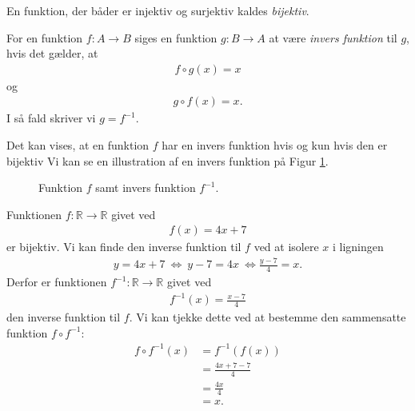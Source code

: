 \begin{defn}
	En funktion, der båder er injektiv og surjektiv kaldes \textit{bijektiv}.
\end{defn}

\begin{defn}
	For en funktion $f:A\to B$ siges en funktion $g:B\to A$ at være \textit{invers funktion} til $g$, hvis det gælder, 
	at 
	\begin{align*}
		f\circ g (x) = x
	\end{align*}
	og
	\begin{align*}
		g \circ f(x) = x.
	\end{align*}
	I så fald skriver vi $g = f^{-1}$.
\end{defn}
Det kan vises, at en funktion $f$ har en invers funktion hvis og kun hvis den er bijektiv
Vi kan se en illustration af en invers funktion på Figur \ref{fig:inv}. 
\begin{figure}[H]
	\centering
	\caption{Funktion $f$ samt invers funktion $f^{-1}$.}
	\label{fig:inv}
\end{figure}
\begin{exa}
Funktionen $f: \mathbb{R} \to \mathbb{R}$ givet ved
\begin{align*}
	f(x) = 4x+7
\end{align*}
er bijektiv. Vi kan finde den inverse funktion til $f$ ved at isolere $x$ i ligningen
\begin{align*}
	y = 4x+7 \ \Leftrightarrow \ y-7 = 4x \ \Leftrightarrow \frac{y-7}{4} = x.
\end{align*}
Derfor er funktionen $f^{-1}:\mathbb{R} \to \mathbb{R}$ givet ved
\begin{align*}
	f^{-1}(x) = \frac{x-7}{4}
\end{align*}
den inverse funktion til $f$. Vi kan tjekke dette ved at bestemme den sammensatte funktion $f\circ f^{-1}$:
\begin{align*}
f\circ f^{-1}(x) &= f^{-1}(f(x))\\
&= \frac{4x+7-7}{4}\\
&= \frac{4x}{4}\\
&= x.
\end{align*}
\end{exa}

